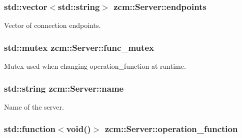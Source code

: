 \hypertarget{classzcm_1_1Server_a488d1398b76851565a4d116f7cf72af1}{
\subsubsection[{endpoints}]{\setlength{\rightskip}{0pt plus 5cm}std\-::vector$<$std\-::string$>$ zcm\-::\-Server\-::endpoints\hspace{0.3cm}{\ttfamily [private]}}}\label{classzcm_1_1Server_a488d1398b76851565a4d116f7cf72af1}


Vector of connection endpoints. 

\hypertarget{classzcm_1_1Server_a3e36a37479457237786db9e163d6fef0}{
\subsubsection[{func\-\_\-mutex}]{\setlength{\rightskip}{0pt plus 5cm}std\-::mutex zcm\-::\-Server\-::func\-\_\-mutex\hspace{0.3cm}{\ttfamily [private]}}}\label{classzcm_1_1Server_a3e36a37479457237786db9e163d6fef0}


Mutex used when changing operation\-\_\-function at runtime. 

\hypertarget{classzcm_1_1Server_a9d59737b196a7abb3a891dc8723e0dcf}{
\subsubsection[{name}]{\setlength{\rightskip}{0pt plus 5cm}std\-::string zcm\-::\-Server\-::name\hspace{0.3cm}{\ttfamily [private]}}}\label{classzcm_1_1Server_a9d59737b196a7abb3a891dc8723e0dcf}


Name of the server. 

\hypertarget{classzcm_1_1Server_a98a640c77898790e3ad10b3276e3cba8}{
\subsubsection[{operation\-\_\-function}]{\setlength{\rightskip}{0pt plus 5cm}std\-::function$<$void()$>$ zcm\-::\-Server\-::operation\-\_\-function\hspace{0.3cm}{\ttfamily [private]}}}\label{classzcm_1_1Server_a98a640c77898790e3ad10b3276e3cba8}


